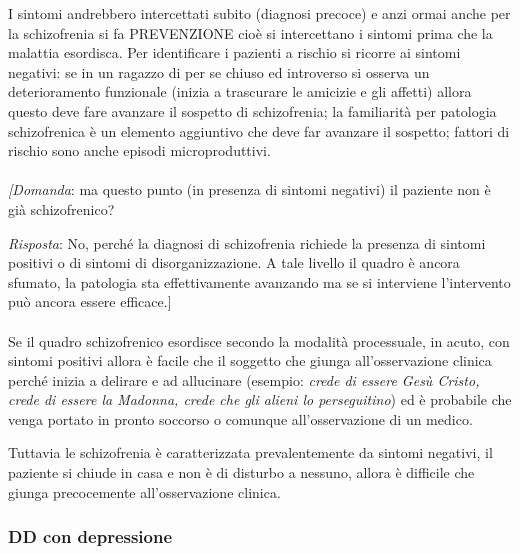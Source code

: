 I sintomi andrebbero intercettati subito (diagnosi precoce) e anzi ormai
anche per la schizofrenia si fa PREVENZIONE cioè si intercettano i
sintomi prima che la malattia esordisca. Per identificare i pazienti a
rischio si ricorre ai sintomi negativi: se in un ragazzo di per se
chiuso ed introverso si osserva un deterioramento funzionale (inizia a
trascurare le amicizie e gli affetti) allora questo deve fare avanzare
il sospetto di schizofrenia; la familiarità per patologia schizofrenica
è un elemento aggiuntivo che deve far avanzare il sospetto; fattori di
rischio sono anche episodi microproduttivi.
\\\\
\emph{{[}Domanda}: ma questo punto (in presenza di sintomi negativi) il
paziente non è già schizofrenico?

\emph{Risposta}: No, perché la diagnosi di schizofrenia richiede la
presenza di sintomi positivi o di sintomi di disorganizzazione. A tale
livello il quadro è ancora sfumato, la patologia sta effettivamente
avanzando ma se si interviene l'intervento può ancora essere
efficace.{]}
\\\\
Se il quadro schizofrenico esordisce secondo la modalità processuale, in
acuto, con sintomi positivi allora è facile che il soggetto che giunga
all'osservazione clinica perché inizia a delirare e ad allucinare
(esempio: \emph{crede di essere Gesù Cristo, crede di essere la Madonna,
crede che gli alieni lo perseguitino}) ed è probabile che venga portato
in pronto soccorso o comunque all'osservazione di un medico.

Tuttavia le schizofrenia è caratterizzata prevalentemente da sintomi
negativi, il paziente si chiude in casa e non è di disturbo a nessuno,
allora è difficile che giunga precocemente all'osservazione clinica.

\subsubsection{DD con depressione}

